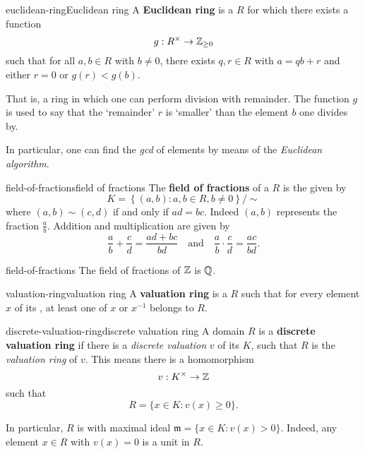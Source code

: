 \begin{topic}{euclidean-ring}{Euclidean ring}
    A \textbf{Euclidean ring} is a  $R$ for which there exists a function
    \[ g : R^\times \to \mathbb{Z}_{\ge 0} \]
    such that for all $a, b \in R$ with $b \ne 0$, there exists $q, r \in R$ with $a = qb + r$ and either $r = 0$ or $g(r) < g(b)$.
    
    That is, a ring in which one can perform division with remainder. The function $g$ is used to say that the `remainder' $r$ is `smaller' than the element $b$ one divides by.
    
    In particular, one can find the \textit{gcd} of elements by means of the \textit{Euclidean algorithm}.
\end{topic}

\begin{topic}{field-of-fractions}{field of fractions}
    The \textbf{field of fractions} of a  $R$ is the  given by
    \[ K = \left\{ (a, b) : a, b \in R, b \ne 0 \right\} / \sim{} \]
    where $(a, b) \sim{} (c, d)$ if and only if $ad = bc$. Indeed $(a, b)$ represents the fraction $\frac{a}{b}$. Addition and multiplication are given by
    \[ \frac{a}{b} + \frac{c}{d} = \frac{ad + bc}{bd} \quad \text{and} \quad \frac{a}{b} \cdot \frac{c}{d} = \frac{ac}{bd} . \]
\end{topic}

\begin{example}{field-of-fractions}
    The field of fractions of $\mathbb{Z}$ is $\mathbb{Q}$.
\end{example}

\begin{topic}{valuation-ring}{valuation ring}
    A \textbf{valuation ring} is a  $R$ such that for every element $x$ of its , at least one of $x$ or $x^{-1}$ belongs to $R$.
\end{topic}

\begin{topic}{discrete-valuation-ring}{discrete valuation ring}
    A domain  $R$ is a \textbf{discrete valuation ring} if there is a \textit{discrete valuation} $v$ of its  $K$, such that $R$ is the \textit{valuation ring} of $v$. This means there is a homomorphism
    \[ v : K^\times \to \mathbb{Z} \]
    such that
    \[ R = \{ x \in K : v(x) \ge 0 \} . \]
    
    In particular, $R$ is  with maximal ideal $\mathfrak{m} = \{ x \in K : v(x) > 0 \}$. Indeed, any element $x \in R$ with $v(x) = 0$ is a unit in $R$.
\end{topic}

